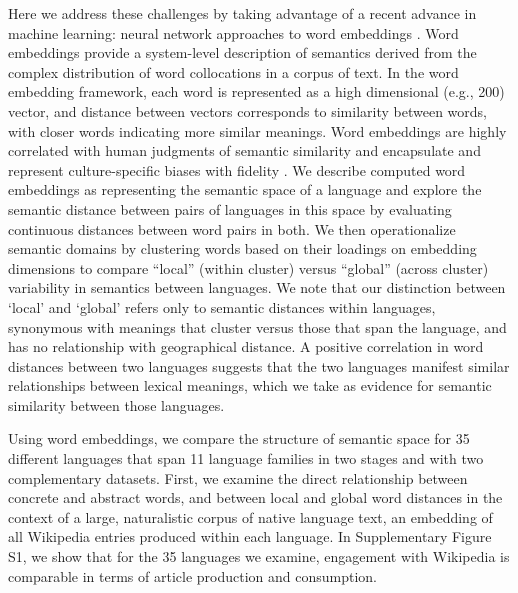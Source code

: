 \documentclass[9pt,twocolumn,twoside,lineno]{pnas-new}
\begin{document}
Here we address these challenges by taking advantage of a recent advance in machine learning: neural network approaches to word embeddings \cite{bojanowski2016enriching,mikolov2013efficient}. Word embeddings provide a system-level description of semantics derived from the complex distribution of word collocations in a corpus of text. In the word embedding framework, each word is represented as a high dimensional (e.g., 200) vector, and distance between vectors corresponds to similarity between words, with closer words indicating more similar meanings. Word embeddings are highly correlated with human judgments of semantic similarity and encapsulate and represent culture-specific biases with fidelity \cite{hill2015simlex,caliskan2017semantics,garg2018word,bolukbasi2016man,kozlowski2019geometry,lewis2020, pereira2016comparative}. We describe computed word embeddings as representing the semantic space of a language and explore the semantic distance between pairs of languages in this space by evaluating continuous distances between word pairs in both. We then operationalize semantic domains by clustering words based on their loadings on embedding dimensions to compare ``local'' (within cluster) versus ``global'' (across cluster) variability in semantics between languages. We note that our distinction between `local' and `global' refers only to semantic distances within languages, synonymous with meanings that cluster versus those that span the language, and has no relationship with geographical distance. A positive correlation in word distances between two languages suggests that the two languages manifest similar relationships between lexical meanings, which we take as evidence for semantic similarity between those languages.


Using word embeddings, we compare the structure of semantic space for 35 different languages that span 11 language families in two stages and with two complementary datasets. First, we examine the direct relationship between concrete and abstract words, and between local and global word distances in the context of a large, naturalistic corpus of native language text, an embedding of all Wikipedia entries produced within each language. In Supplementary Figure S1, we show that for the 35 languages we examine, engagement with Wikipedia is comparable in terms of article production and consumption.
\end{document}
